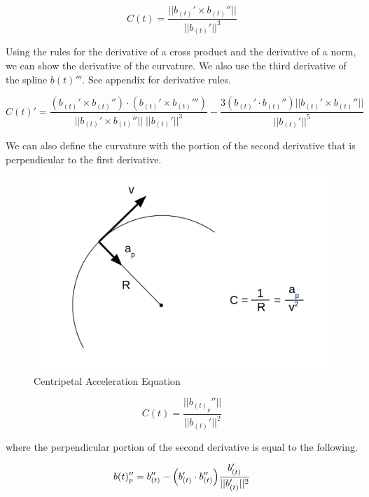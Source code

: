 \documentclass{article}
\begin{document}
\begin{equation}
    C(t) = \frac{||b_{(t)}' \times b_{(t)}''||}{||b_{(t)}'||^3}
\end{equation}

Using the rules for the derivative of a cross product and the derivative of a norm, we can show the derivative of the curvature. We also use the third derivative of the spline \(b(t)'''\). See appendix for derivative rules.

\begin{equation}
    C(t)' = \frac{(b_{(t)}' \times b_{(t)}'') \cdot (b_{(t)}' \times b_{(t)}''')}{||b_{(t)}' \times b_{(t)}''||\;||b_{(t)}'||^3} - \frac{3(b_{(t)}' \cdot b_{(t)}'') || b_{(t)}' \times b_{(t)}''||}{||b_{(t)}'||^5}
\end{equation}


We can also define the curvature with the portion of the second derivative that is perpendicular to the first derivative.

\begin{figure}[h]
\begin{center}
\includegraphics[scale=.23]{Centripetal_Acceleration.png}
\end{center}
\caption{Centripetal Acceleration Equation}
\label{Fig:Centripetal_Acceleration}
\end{figure}

\begin{equation}
    C(t) = \frac{||b_{(t)}_p''||}{||b_{(t)}'||^2}
\end{equation}

where the perpendicular portion of the second derivative is equal to the following.

\begin{equation}
    b(t)_p'' = b_{(t)}'' -  \Bigl(b_{(t)}' \cdot b_{(t)}''\Bigl) \frac{b_{(t)}'}{||b_{(t)}'||^2}
\end{equation}
\end{document}
